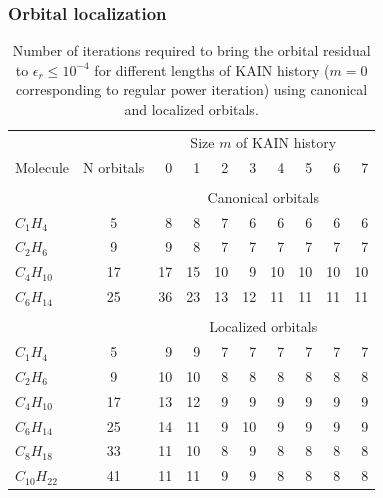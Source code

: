 \documentclass[mathserif]{beamer}
\begin{document}
\begin{frame}
\frametitle{Orbital localization}
\begin{table}
\tiny
\centering
\caption{\scriptsize{Number of iterations required to bring the orbital residual to 
	$\epsilon_r\leq10^{-4}$ for different lengths of KAIN history ($m=0$ corresponding
	to regular power iteration) using canonical and localized orbitals.}}
\begin{tabular}{lcrrrrrrrr}
\hline
\hline
	    &		&\multicolumn{8}{c}{Size $m$ of KAIN history}\\
Molecule    & N orbitals&  0	&  1    &  2    &  3    &  4    &  5    &  6    &  7    \\
\hline
              	&   	&       &       &       &       &       &       &       &       \\
&&\multicolumn{8}{c}{Canonical orbitals}\\
$C_{ 1}H_{ 4}$	&  5    &  8    &  8    &  7    &  6    &  6    &  6    &  6    &  6    \\ 
$C_{ 2}H_{ 6}$	&  9    &  9    &  8    &  7    &  7    &  7    &  7    &  7    &  7    \\ 
$C_{ 4}H_{10}$	& 17    & 17    & 15    & 10    &  9    & 10    & 10    & 10    & 10    \\
$C_{ 6}H_{14}$	& 25	& 36    & 23    & 13    & 12    & 11    & 11    & 11    & 11    \\
              	&   	&       &       &       &       &       &       &       &       \\
&&\multicolumn{8}{c}{Localized orbitals}\\
$C_{ 1}H_{ 4}$	&  5	&  9    &  9    &  7    &  7    &  7    &  7    &  7    &  7    \\ 
$C_{ 2}H_{ 6}$	&  9	& 10    & 10    &  8    &  8    &  8    &  8    &  8    &  8    \\ 
$C_{ 4}H_{10}$	& 17	& 13    & 12    &  9    &  9    &  9    &  9    &  9    &  9    \\
$C_{ 6}H_{14}$	& 25	& 14    & 11    &  9    & 10    &  9    &  9    &  9    &  9    \\
$C_{ 8}H_{18}$	& 33	& 11    & 10    &  8    &  9    &  8    &  8    &  8    &  8    \\
$C_{10}H_{22}$	& 41	& 11    & 11    &  9    &  9    &  8    &  8    &  8    &  8    \\
\hline
\hline
\end{tabular}
\end{table}
\end{frame}
\end{document}
